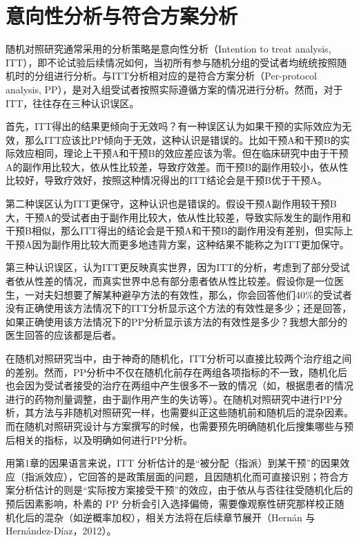 \documentclass[
  chinese-hans,
  letterpaper,
  DIV=11,
  numbers=noendperiod]{scrreprt}
\begin{document}
\section{意向性分析与符合方案分析}\label{ux610fux5411ux6027ux5206ux6790ux4e0eux7b26ux5408ux65b9ux6848ux5206ux6790}

随机对照研究通常采用的分析策略是意向性分析（Intention to treat analysis,
ITT），即不论试验后续情况如何，当初所有参与随机分组的受试者均统统按照随机时的分组进行分析。与ITT分析相对应的是符合方案分析（Per-protocol
analysis,
PP），是对入组受试者按照实际遵循方案的情况进行分析。然而，对于ITT，往往存在三种认识误区。

首先，ITT得出的结果更倾向于无效吗？有一种误区认为如果干预的实际效应为无效，那么ITT应该比PP倾向于无效，这种认识是错误的。比如干预A和干预B的实际效应相同，理论上干预A和干预B的效应差应该为零。但在临床研究中由于干预A的副作用比较大，依从性比较差，导致疗效差。而干预B的副作用较小，依从性比较好，导致疗效好，按照这种情况得出的ITT结论会是干预B优于干预A。

第二种误区认为ITT更保守，这种认识也是错误的。假设干预A副作用较干预B大，干预A的受试者由于副作用比较大，依从性比较差，导致实际发生的副作用和干预B相似，那么ITT得出的结论会是干预A和干预B的副作用没有差别，但实际上干预A因为副作用比较大而更多地违背方案，这种结果不能称之为ITT更加保守。

第三种认识误区，认为ITT更反映真实世界，因为ITT的分析，考虑到了部分受试者依从性差的情况，而真实世界中总有部分患者依从性比较差。假设你是一位医生，一对夫妇想要了解某种避孕方法的有效性，那么，你会回答他们40\%的受试者没有正确使用该方法情况下的ITT分析显示这个方法的有效性是多少；还是回答，如果正确使用该方法情况下的PP分析显示该方法的有效性是多少？我想大部分的医生回答的应该都是后者。

在随机对照研究当中，由于神奇的随机化，ITT分析可以直接比较两个治疗组之间的差别。然而，PP分析中不仅在随机化前存在两组各项指标的不一致，随机化后也会因为受试者接受的治疗在两组中产生很多不一致的情况（如，根据患者的情况进行的药物剂量调整，由于副作用产生的失访等）。在随机对照研究中进行PP分析，其方法与非随机对照研究一样，也需要纠正这些随机前和随机后的混杂因素。而在随机对照研究设计与方案撰写的时候，也需要预先明确随机化后搜集哪些与预后相关的指标，以及明确如何进行PP分析。

用第1章的因果语言来说，ITT
分析估计的是``被分配（指派）到某干预''的因果效应（指派效应），它回答的是政策层面的问题，且因随机化而可直接识别；符合方案分析估计的则是``实际按方案接受干预''的效应，由于依从与否往往受随机化后的预后因素影响，朴素的
PP
分析会引入选择偏倚，需要像观察性研究那样校正随机化后的混杂（如逆概率加权），相关方法将在后续章节展开（Hernán
与 Hernández-Díaz，2012）。
\end{document}
